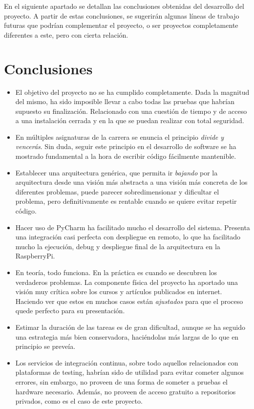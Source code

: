 
En el siguiente apartado se detallan las conclusiones obtenidas del desarrollo del proyecto. A partir de estas conclusiones, se sugerirán algunas líneas de trabajo futuras que podrían complementar el proyecto, o ser proyectos completamente diferentes a este, pero con cierta relación. 

\section{Conclusiones}

\begin{itemize}
\item El objetivo del proyecto no se ha cumplido completamente. Dada la magnitud del mismo, ha sido imposible llevar a cabo todas las pruebas que habrían supuesto su finalización. Relacionado con una cuestión de tiempo y de acceso a una instalación cerrada y en la que se puedan realizar con total seguridad.
\item En múltiples asignaturas de la carrera se enuncia el principio \emph{divide y vencerás}. Sin duda, seguir este principio en el desarrollo de software se ha mostrado fundamental a la hora de escribir código fácilmente mantenible. 
\item Establecer una arquitectura genérica, que permita ir \textit{bajando} por la arquitectura desde una visión más abstracta a una visión más concreta de los diferentes problemas, puede parecer sobredimensionar y dificultar el problema, pero definitivamente es rentable cuando se quiere evitar repetir código.
\item Hacer uso de PyCharm ha facilitado mucho el desarrollo del sistema. Presenta una integración casi perfecta con despliegue en remoto, lo que ha facilitado mucho la ejecución, debug y despliegue final de la arquitectura en la RaspberryPi.
\item En teoría, todo funciona. En la práctica es cuando se descubren los verdaderos problemas. La componente física del proyecto ha aportado una visión muy crítica sobre los cursos y artículos publicados en internet. Haciendo ver que estos en muchos casos están \emph{ajustados} para que el proceso quede perfecto para su presentación.
\item Estimar la duración de las tareas es de gran dificultad, aunque se ha seguido una estrategia más bien conservadora, haciéndolas más largas de lo que en principio se preveía. 
\item Los servicios de integración continua, sobre todo aquellos relacionados con plataformas de testing, habrían sido de utilidad para evitar cometer algunos errores, sin embargo, no proveen de una forma de someter a pruebas el hardware necesario. Además, no proveen de acceso gratuito a repositorios privados, como es el caso de este proyecto.

\end{itemize}
